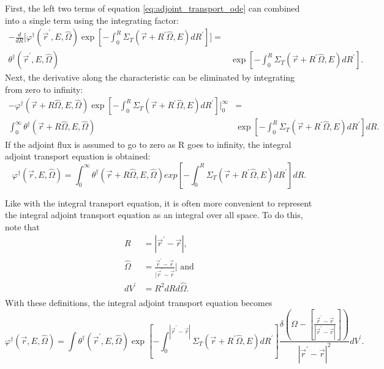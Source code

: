 First, the left two terms of equation \ref{eq:adjoint_transport_ode} can
combined into a single term using the integrating factor:
\begin{align}
  -\frac{d}{dR}\bigg[\varphi^{\dagger}(\vec{r}^{'},E,\hat{\Omega})
    \exp{\left[-\int_0^R \Sigma_T(\vec{r}+R^{'}\hat{\Omega},E)dR^{'}\right]}
    \bigg] = \nonumber \\
  \theta^{\dagger}(\vec{r}^{'},E,\hat{\Omega})
  &\exp{\left[-\int_0^R \Sigma_T(\vec{r}+R^{'}\hat{\Omega},E)dR^{'} \right]}.
  \nonumber
\end{align}
Next, the derivative along the characteristic can be eliminated by integrating
from zero to infinity:
\begin{align}
  -\varphi^{\dagger}(\vec{r} + R\hat{\Omega},E,\hat{\Omega})
  \exp{\left[-\int_0^R \Sigma_T(\vec{r}+R^{'}\hat{\Omega},E)dR^{'}\right]}
  \bigg|_0^{\infty} & = \nonumber \\
  \int_0^{\infty} 
  \theta^{\dagger}(\vec{r} + R\hat{\Omega},E,\hat{\Omega})
  &\exp{\left[-\int_0^R \Sigma_T(\vec{r}+R^{'}\hat{\Omega},E)dR^{'} \right]} dR.
  \nonumber 
\end{align}
If the adjoint flux is assumed to go to zero as R goes to infinity, the integral
adjoint transport equation is obtained:
\begin{equation}
  \varphi^{\dagger}(\vec{r},E,\hat{\Omega}) = 
  \int_0^{\infty} \theta^{\dagger}(\vec{r} + R\hat{\Omega},E,\hat{\Omega})
  exp\left[-\int_0^R \Sigma_T(\vec{r}+R^{'}\hat{\Omega},E)dR^{'} \right] dR.
  \label{eq:line_integral_adj_transport_eqn}
\end{equation}

Like with the integral transport equation, it is often more convenient to 
represent the integral adjoint transport equation as an integral over all space.
To do this, note that
\begin{align}
  R & = |\vec{r}^{'} - \vec{r}|, \nonumber \\
  \hat{\Omega} & = \frac{\vec{r}^{'} - \vec{r}}{|\vec{r}^{'} - \vec{r}}| 
  \text{ and} \nonumber \\
  dV^{'} & = R^2dRd\hat{\Omega}. \nonumber \\
\end{align}
With these definitions, the integral adjoint transport equation becomes
\begin{equation*}
    \varphi^{\dagger}(\vec{r},E,\hat{\Omega}) = 
    \int \theta^{\dagger}(\vec{r}^{'},E,\hat{\Omega})
    \exp{\left[-\int_0^{|\vec{r}^{'} - \vec{r}|} 
      \Sigma_T(\vec{r}+R^{'}\hat{\Omega},E)dR^{'} \right]}
    \frac{\delta \left(\Omega - \left[\frac{\vec{r}^{'} - \vec{r}}
        {|\vec{r}^{'} - \vec{r}|}\right]\right)}
    {|\vec{r}^{'} - \vec{r}|^2} dV^{'}.
\end{equation*}

